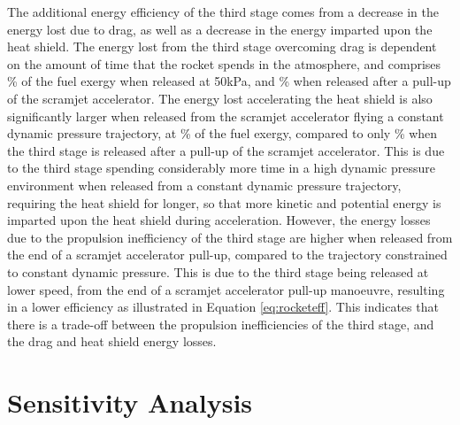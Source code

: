 The additional energy efficiency of the third stage comes from a decrease in the energy lost due to drag, as well as a decrease in the energy imparted upon the heat shield. 
The energy lost from the third stage overcoming drag is dependent on the amount of time that the rocket spends in the atmosphere, and comprises \WDthreeConstqNoReturn \% of the fuel exergy when released at 50kPa, and \WDthreeStandardNoReturn \% when released after a pull-up of the scramjet accelerator.
The energy lost accelerating the heat shield is also significantly larger when released from the scramjet accelerator flying a constant dynamic pressure trajectory, at \WHSthreeConstqNoReturn \% of the fuel exergy, compared to only \WHSthreeStandardNoReturn \% when the third stage is released after a pull-up of the scramjet accelerator. This is due to the third stage spending considerably more time in a high dynamic pressure environment when released from a constant dynamic pressure trajectory, requiring the heat shield for longer, so that more kinetic and potential energy is imparted upon the heat shield during acceleration. However, the energy losses due to the propulsion inefficiency of the third stage are higher when released from the end of a scramjet accelerator pull-up, compared to the trajectory constrained to constant dynamic pressure. This is due to the third stage being released at lower speed, from the end of a scramjet accelerator pull-up manoeuvre, resulting in a lower efficiency as illustrated in Equation \ref{eq:rocketeff}. This indicates that there is a trade-off between the propulsion inefficiencies of the third stage, and the drag and heat shield energy losses.



 

  

\section{Sensitivity Analysis}\label{sec:sensitivityNoReturn}

